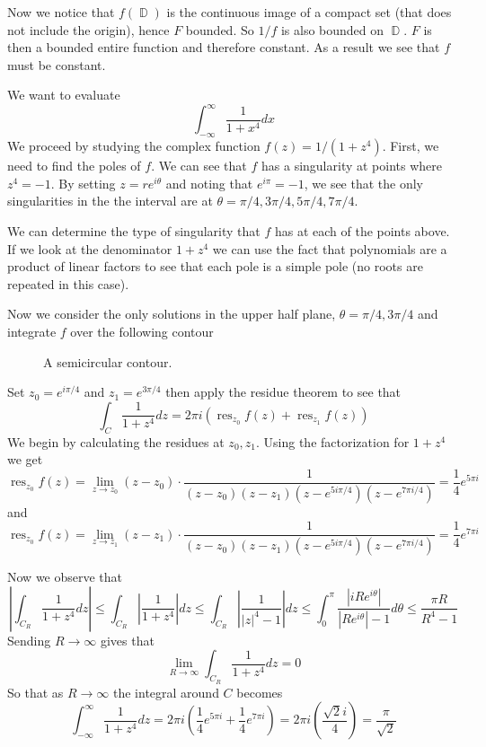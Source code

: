 \documentclass{article}
\DeclareMathOperator{\D}{\mathbb{D}}
\newcommand{\exercise}[1]{\noindent{\textbf{Exercise #1:}}}
\newcommand{\res}{\operatorname{res}}
\begin{document}
Now we notice that $f(\D)$ is the continuous image of a compact set
(that does not include the origin), hence $F$ bounded. So $1/f$ is
also bounded on $\D$. $F$ is then a bounded entire function and
therefore constant. As a result we see that $f$ must be constant.

\exercise{3.8.2}

We want to evaluate
\[
\int_{-\infty}^\infty \frac{1}{1+x^4}dx
\]
We proceed by studying the complex function $f(z) = 1/(1+z^4)$. First,
we need to find the poles of $f$. We can see that $f$ has a
singularity at points where $z^4 = -1$. By setting $z = re^{i\theta}$
and noting that $e^{i\pi} = -1$, we see that the only singularities in
the the interval are at $\theta = \pi/4, 3\pi/4,5\pi/4,7\pi/4$.

We can determine the type of singularity that $f$ has at each of
the points above. If we look at the denominator $1+z^4$ we can use the
fact that polynomials are a product of linear factors to see that each
pole is a simple pole (no roots are repeated in this case).

Now we consider the only solutions in the upper
half plane, $\theta = \pi/4,3\pi/4$ and integrate $f$ over the
following contour

\begin{figure*}[!h]
  \centering
  \caption{A semicircular contour.}
\end{figure*}

Set $z_0 = e^{i\pi/4}$ and $z_1 = e^{3\pi/4}$ then apply the residue
theorem to see that
\[
\int_C \frac{1}{1+z^4}dz = 2\pi i(\res_{z_0} f(z) +
\res_{z_1} f(z))
\]
We begin by calculating the residues at $z_0, z_1$. Using
the factorization for $1+z^4$ we get
\[
\res_{z_0} f(z) = \lim_{z \to z_0}(z - z_0) \cdot
\frac{1}{(z-z_0)(z-z_1)(z-e^{5i\pi/4})(z-e^{7\pi i/4})} =
\frac{1}{4}e^{5\pi i}
\]
and
\[
\res_{z_0} f(z) = \lim_{z \to z_1}(z - z_1) \cdot
\frac{1}{(z-z_0)(z-z_1)(z-e^{5i\pi/4})(z-e^{7\pi i/4})} =
\frac{1}{4}e^{7\pi i}
\]

Now we observe that
\[
\left|\int_{C_R} \frac{1}{1+z^4}dz\right| \leq \int_{C_R}\left|
  \frac{1}{1+z^4}\right|dz \leq \int_{C_R}\left| \frac{1}{|z|^4 -
    1}\right|dz \leq \int_0^\pi \frac{|iRe^{i\theta}|}{|Re^{i\theta}|
  - 1}d\theta \leq \frac{\pi R}{R^4 - 1}
\]
Sending $R \to \infty$ gives that
\[
\lim_{R\to\infty} \int_{C_R} \frac{1}{1+z^4}dz = 0
\]
So that as $R \to\infty$ the integral around $C$ becomes
\[
\int_{-\infty}^\infty \frac{1}{1+z^4}dz = 2\pi
i\left(\frac{1}{4}e^{5\pi i} + \frac{1}{4}e^{7\pi i}\right) = 2\pi
i\left(\frac{\sqrt{2}i}{4}\right) = \frac{\pi}{\sqrt{2}}
\]
\end{document}
